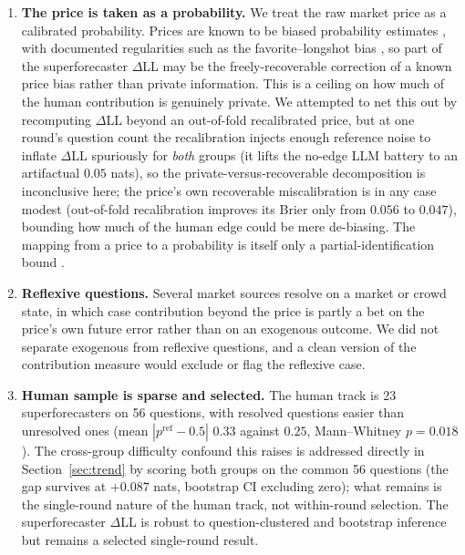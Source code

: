 \documentclass[11pt]{article}
\begin{document}
\begin{enumerate}[leftmargin=1.4em,itemsep=2pt]
\item \textbf{The price is taken as a probability.} We treat the raw market price as a calibrated probability. Prices are known to be biased probability estimates \citep{wolfers2006}, with documented regularities such as the favorite--longshot bias \citep{snowberg2010}, so part of the superforecaster $\Delta$LL may be the freely-recoverable correction of a known price bias rather than private information. This is a ceiling on how much of the human contribution is genuinely private. We attempted to net this out by recomputing $\Delta$LL beyond an out-of-fold recalibrated price, but at one round's question count the recalibration injects enough reference noise to inflate $\Delta$LL spuriously for \emph{both} groups (it lifts the no-edge LLM battery to an artifactual $0.05$ nats), so the private-versus-recoverable decomposition is inconclusive here; the price's own recoverable miscalibration is in any case modest (out-of-fold recalibration improves its Brier only from $0.056$ to $0.047$), bounding how much of the human edge could be mere de-biasing. The mapping from a price to a probability is itself only a partial-identification bound \citep{manski2006}.
\item \textbf{Reflexive questions.} Several market sources resolve on a market or crowd state, in which case contribution beyond the price is partly a bet on the price's own future error rather than on an exogenous outcome. We did not separate exogenous from reflexive questions, and a clean version of the contribution measure would exclude or flag the reflexive case.
\item \textbf{Human sample is sparse and selected.} The human track is 23 superforecasters on 56 questions, with resolved questions easier than unresolved ones (mean $|p^{\mathrm{ref}}-0.5|$ $0.33$ against $0.25$, Mann--Whitney $p=0.018$). The cross-group difficulty confound this raises is addressed directly in Section~\ref{sec:trend} by scoring both groups on the common 56 questions (the gap survives at $+0.087$ nats, bootstrap CI excluding zero); what remains is the single-round nature of the human track, not within-round selection. The superforecaster $\Delta$LL is robust to question-clustered and bootstrap inference but remains a selected single-round result.
\end{enumerate}
\end{document}
